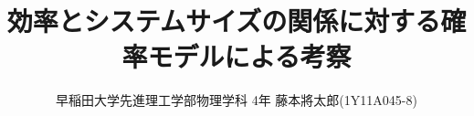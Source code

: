 \documentclass[a4j,11pt,onecolumn,oneside,openany]{jsbook}
\title{効率とシステムサイズの関係に対する確率モデルによる考察}
\author{早稲田大学先進理工学部物理学科 4年 藤本將太郎(1Y11A045-8)}
\begin{document}
\begin{titlepage}
\maketitle
\thispagestyle{empty}
\end{titlepage}
\newpage
{}
\begin{abstract}

\end{abstract}
\newpage
\tableofcontents
\newpage
{}





\end{document}
